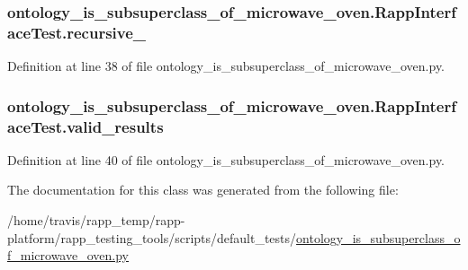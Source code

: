 \hypertarget{classontology__is__subsuperclass__of__microwave__oven_1_1RappInterfaceTest_ae7e9f8875bf35c0d2bc1cf77f71a3291}{
\subsubsection[{recursive\-\_\-}]{\setlength{\rightskip}{0pt plus 5cm}ontology\-\_\-is\-\_\-subsuperclass\-\_\-of\-\_\-microwave\-\_\-oven.\-Rapp\-Interface\-Test.\-recursive\-\_\-}}\label{classontology__is__subsuperclass__of__microwave__oven_1_1RappInterfaceTest_ae7e9f8875bf35c0d2bc1cf77f71a3291}


Definition at line 38 of file ontology\-\_\-is\-\_\-subsuperclass\-\_\-of\-\_\-microwave\-\_\-oven.\-py.

\hypertarget{classontology__is__subsuperclass__of__microwave__oven_1_1RappInterfaceTest_a7ab8b4674e5c00e5697e9c8408397062}{
\subsubsection[{valid\-\_\-results}]{\setlength{\rightskip}{0pt plus 5cm}ontology\-\_\-is\-\_\-subsuperclass\-\_\-of\-\_\-microwave\-\_\-oven.\-Rapp\-Interface\-Test.\-valid\-\_\-results}}\label{classontology__is__subsuperclass__of__microwave__oven_1_1RappInterfaceTest_a7ab8b4674e5c00e5697e9c8408397062}


Definition at line 40 of file ontology\-\_\-is\-\_\-subsuperclass\-\_\-of\-\_\-microwave\-\_\-oven.\-py.



The documentation for this class was generated from the following file\-:\begin{DoxyCompactItemize}
\item 
/home/travis/rapp\-\_\-temp/rapp-\/platform/rapp\-\_\-testing\-\_\-tools/scripts/default\-\_\-tests/\hyperlink{ontology__is__subsuperclass__of__microwave__oven_8py}{ontology\-\_\-is\-\_\-subsuperclass\-\_\-of\-\_\-microwave\-\_\-oven.\-py}\end{DoxyCompactItemize}
